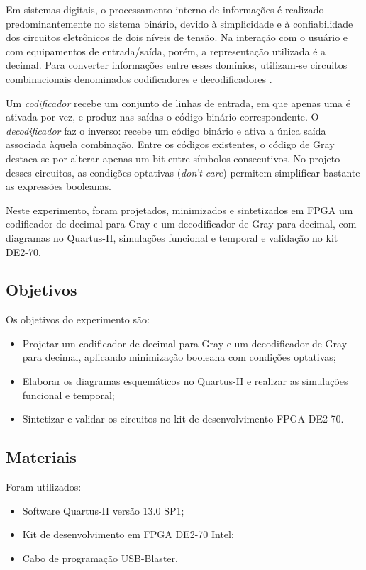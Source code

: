 \documentclass[12pt]{article}
\begin{document}
Em sistemas digitais, o processamento interno de informações é realizado predominantemente no sistema binário, devido à simplicidade e à confiabilidade dos circuitos eletrônicos de dois níveis de tensão. Na interação com o usuário e com equipamentos de entrada/saída, porém, a representação utilizada é a decimal. Para converter informações entre esses domínios, utilizam-se circuitos combinacionais denominados codificadores e decodificadores \cite{wakerly90}.

Um \textit{codificador} recebe um conjunto de linhas de entrada, em que apenas uma é ativada por vez, e produz nas saídas o código binário correspondente. O \textit{decodificador} faz o inverso: recebe um código binário e ativa a única saída associada àquela combinação. Entre os códigos existentes, o código de Gray destaca-se por alterar apenas um bit entre símbolos consecutivos. No projeto desses circuitos, as condições optativas (\textit{don't care}) permitem simplificar bastante as expressões booleanas.

Neste experimento, foram projetados, minimizados e sintetizados em FPGA um codificador de decimal para Gray e um decodificador de Gray para decimal, com diagramas no Quartus-II, simulações funcional e temporal e validação no kit DE2-70.

\subsection{Objetivos}
\label{sec:Objetivos}

Os objetivos do experimento são:
\begin{itemize}
    \item Projetar um codificador de decimal para Gray e um decodificador de Gray para decimal, aplicando minimização booleana com condições optativas;
    \item Elaborar os diagramas esquemáticos no Quartus-II e realizar as simulações funcional e temporal;
    \item Sintetizar e validar os circuitos no kit de desenvolvimento FPGA DE2-70.
\end{itemize}

\subsection{Materiais} 
\label{sec:Materiais}

Foram utilizados:
\begin{itemize}
    \item Software Quartus-II versão 13.0 SP1;
    \item Kit de desenvolvimento em FPGA DE2-70 Intel;
    \item Cabo de programação USB-Blaster.
\end{itemize}
\end{document}
